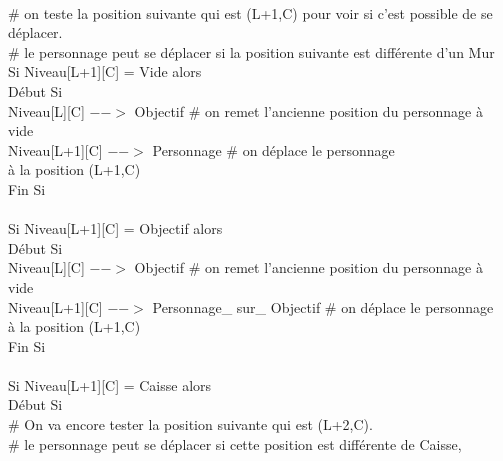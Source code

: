 \documentclass{article}
\begin{document}
\begin{tabbing}
\\	\hspace{3cm}	\# on teste la position suivante qui est (L+1,C)	pour voir si c'est possible de se déplacer.
\\	\hspace{3cm}	\# le personnage peut se déplacer si la position suivante est différente d'un Mur			
\\	\hspace{3cm}	Si Niveau[L+1][C] = Vide alors			
\\	\hspace{3cm}	Début Si
\\	\hspace{4cm}		Niveau[L][C] $-->$ Objectif 	\# on remet l'ancienne position du personnage à vide
\\	\hspace{4cm}	Niveau[L+1][C] $-->$ Personnage	\# on déplace le personnage
\\ \hspace{4cm} à la position (L+1,C)
\\	\hspace{3cm}	Fin Si 
\\		
\\	\hspace{3cm}	Si Niveau[L+1][C] = Objectif alors			
\\	\hspace{3cm}	Début Si
\\	\hspace{4cm}		Niveau[L][C] $-->$ Objectif 			\# on remet l'ancienne position du personnage à vide
\\	\hspace{4cm}		Niveau[L+1][C] $-->$ Personnage\_ sur\_ Objectif	\# on déplace le personnage
\\ \hspace{4cm} à la position (L+1,C)
\\	\hspace{3cm}	Fin Si 
\\		
\\	\hspace{3cm}	Si Niveau[L+1][C] = Caisse alors			
\\	\hspace{3cm}	Début Si
\\	\hspace{4cm}		\# On va encore tester la position suivante qui est (L+2,C). 
\\	\hspace{4cm}		\# le personnage peut se déplacer si cette position est différente de Caisse,

\end{tabbing}
\end{document}
